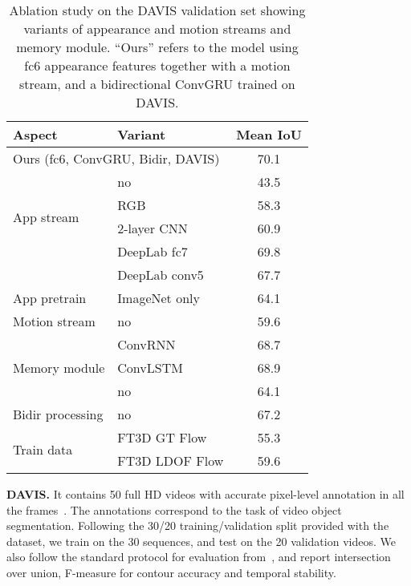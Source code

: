 \documentclass[10pt,twocolumn,letterpaper]{article}
\begin{document}
\begin{table}[t]
\begin{center}
\begin{tabular}{l|l|c}
\hline
Aspect & Variant & Mean IoU  \\
\hline
  \multicolumn{2}{l|}{Ours (fc6, ConvGRU, Bidir, DAVIS)}  & 70.1    \\
  \hline
  \multirow{4}{*}{App stream} & no  & 43.5  \\
   & RGB  & 58.3  \\
   & 2-layer CNN  & 60.9 \\
   & DeepLab fc7  & 69.8  \\
   & DeepLab conv5  & 67.7  \\
  \hline
  App pretrain & ImageNet only  & 64.1  \\
  \hline
  Motion stream & no  & 59.6  \\
  \hline
  \multirow{3}{*}{Memory module} & ConvRNN & 68.7  \\
  & ConvLSTM  & 68.9  \\  
  & no  &  64.1 \\  
    \hline
  Bidir processing & no & 67.2  \\
  \hline
     \multirow{2}{*}{Train data} & FT3D GT Flow & 55.3  \\
   & FT3D LDOF Flow & 59.6   \\
  \hline
\end{tabular}
\vspace{0.1cm}
\caption{Ablation study on the DAVIS validation set showing variants of
appearance and motion streams and memory module. ``Ours'' refers to the model
using fc6 appearance features together with a motion stream, and a 
bidirectional ConvGRU trained on DAVIS.}
\label{tbl:abl}
\vspace{-0.6cm}
\end{center}
\end{table}

\vspace{0.3cm}\noindent \textbf{DAVIS.}
It contains 50 full HD videos with accurate pixel-level annotation in all the
frames~\cite{Perazzi16}. The annotations correspond to the task of video object
segmentation. Following the 30/20 training/validation split provided with the
dataset, we train on the 30 sequences, and test on the 20 validation videos. We
also follow the standard protocol for evaluation from~\cite{Perazzi16}, and
report intersection over union, F-measure for contour accuracy and temporal
stability.
\end{document}
